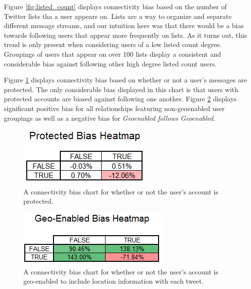 Figure \ref{fig:listed_count} displays connectivity bias based on the number of Twitter lists tha a user appears on.  Lists are a way to organize and separate different message streams, and our intuition here was that there would be a bias towards following users that appear more frequently on lists.  As it turns out, this trend is only present when considering users of a low listed count degree.  Groupings of users that appear on over 100 lists display a consistent and considerable bias against following other high degree listed count users.

Figure \ref{fig:protected} displays connectivity bias based on whether or not a user's messages are protected.  The only considerable bias displayed in this chart is that users with protected accounts are biased against following one another.  Figure \ref{fig:geoenabled} displays significant positive bias for all relationships featuring non-geoenabled user groupings as well as a negative bias for \textit{Geoenabled follows Geoenabled}.

\begin{figure}[t]
 \centering
 \includegraphics[bb=0 0 188 86, scale=.5]{./images/protected.png}
 \caption{A connectivity bias chart for whether or not the user's account is protected.}
 \label{fig:protected}
\end{figure}

\begin{figure}[t]
 \centering
 \includegraphics[bb=0 0 214 80, scale=.5]{./images/geoenabled.png}
 \caption{A connectivity bias chart for whether or not the user's account is geo-enabled to include location information with each tweet.}
 \label{fig:geoenabled}
\end{figure}

